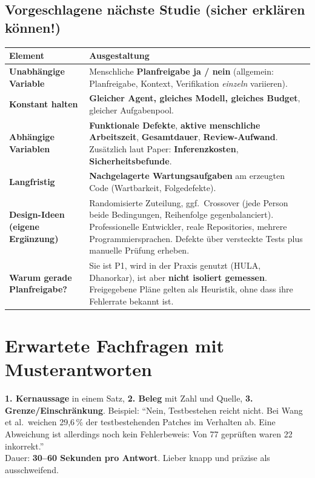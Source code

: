 \documentclass[12pt,a4paper]{article}
\begin{document}
\subsection{Vorgeschlagene nächste Studie (sicher erklären können!)}
\begin{longtable}{@{}>{\bfseries}p{4.2cm}p{11.8cm}@{}}
\toprule
Element & Ausgestaltung \\
\midrule
\endhead
Unabhängige Variable & Menschliche \textbf{Planfreigabe ja / nein} (allgemein: Planfreigabe, Kontext, Verifikation \emph{einzeln} variieren). \\
Konstant halten & \textbf{Gleicher Agent, gleiches Modell, gleiches Budget}, gleicher Aufgabenpool. \\
Abhängige Variablen & \textbf{Funktionale Defekte}, \textbf{aktive menschliche Arbeitszeit}, \textbf{Gesamtdauer}, \textbf{Review-Aufwand}. Zusätzlich laut Paper: \textbf{Inferenzkosten}, \textbf{Sicherheitsbefunde}. \\
Langfristig & \textbf{Nachgelagerte Wartungsaufgaben} am erzeugten Code (Wartbarkeit, Folgedefekte). \\
Design-Ideen (eigene Ergänzung) & Randomisierte Zuteilung, ggf.\ Crossover (jede Person beide Bedingungen, Reihenfolge gegenbalanciert). Professionelle Entwickler, reale Repositories, mehrere Programmiersprachen. Defekte über versteckte Tests plus manuelle Prüfung erheben. \\
Warum gerade Planfreigabe? & Sie ist P1, wird in der Praxis genutzt (HULA, Dhanorkar), ist aber \textbf{nicht isoliert gemessen}. Freigegebene Pläne gelten als Heuristik, ohne dass ihre Fehlerrate bekannt ist. \\
\bottomrule
\end{longtable}

\section{Erwartete Fachfragen mit Musterantworten}
\label{sec:fragen}

\begin{tipp}
\textbf{1. Kernaussage} in einem Satz, \textbf{2. Beleg} mit Zahl und Quelle, \textbf{3. Grenze/Einschränkung}. Beispiel: \enquote{Nein, Testbestehen reicht nicht. Bei Wang et al.\ weichen 29,6\,\% der testbestehenden Patches im Verhalten ab. Eine Abweichung ist allerdings noch kein Fehlerbeweis: Von 77 geprüften waren 22 inkorrekt.}\\
Dauer: \textbf{30--60 Sekunden pro Antwort}. Lieber knapp und präzise als ausschweifend.
\end{tipp}
\end{document}
